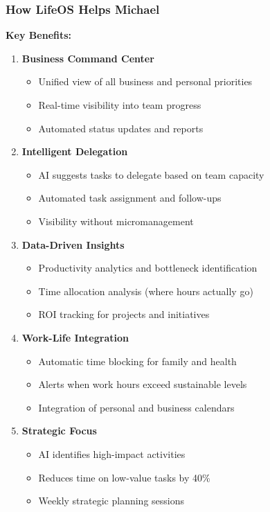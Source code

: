 \subsubsection{How LifeOS Helps Michael}

\textbf{Key Benefits:}

\begin{enumerate}
    \item \textbf{Business Command Center}
    \begin{itemize}
        \item Unified view of all business and personal priorities
        \item Real-time visibility into team progress
        \item Automated status updates and reports
    \end{itemize}
    
    \item \textbf{Intelligent Delegation}
    \begin{itemize}
        \item AI suggests tasks to delegate based on team capacity
        \item Automated task assignment and follow-ups
        \item Visibility without micromanagement
    \end{itemize}
    
    \item \textbf{Data-Driven Insights}
    \begin{itemize}
        \item Productivity analytics and bottleneck identification
        \item Time allocation analysis (where hours actually go)
        \item ROI tracking for projects and initiatives
    \end{itemize}
    
    \item \textbf{Work-Life Integration}
    \begin{itemize}
        \item Automatic time blocking for family and health
        \item Alerts when work hours exceed sustainable levels
        \item Integration of personal and business calendars
    \end{itemize}
    
    \item \textbf{Strategic Focus}
    \begin{itemize}
        \item AI identifies high-impact activities
        \item Reduces time on low-value tasks by 40\%
        \item Weekly strategic planning sessions
    \end{itemize}
\end{enumerate}


